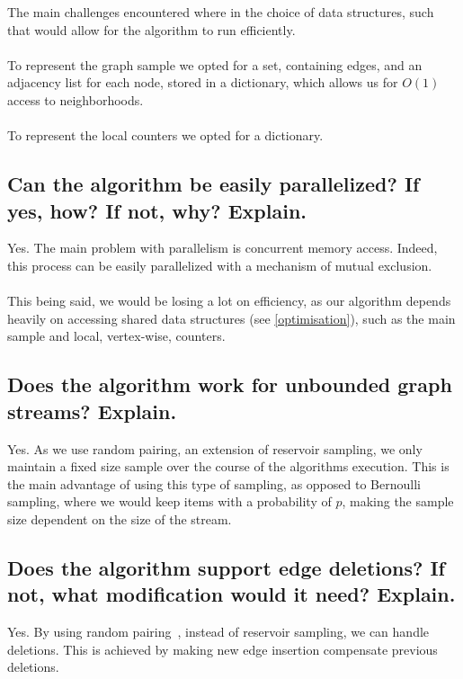 \documentclass[]{article}
\begin{document}
The main challenges encountered where in the choice of data structures, such that would allow for the algorithm to run efficiently.\\
\\
To represent the graph sample we opted for a set, containing edges, and an adjacency list for each node, stored in a dictionary, which allows us for $O(1)$ access to neighborhoods.\\
\\
To represent the local counters we opted for a dictionary.

\subsection{Can the algorithm be easily parallelized? If yes, how? If not, why? Explain.}

Yes. The main problem with parallelism is concurrent memory access. Indeed, this process can be easily parallelized with a mechanism of mutual exclusion.\\
\\
This being said, we would be losing a lot on efficiency, as our algorithm depends heavily on accessing shared data structures (see \ref{optimisation}), such as the main sample and local, vertex-wise, counters.

\subsection{Does the algorithm work for unbounded graph streams? Explain.}

Yes. As we use random pairing, an extension of reservoir sampling, we only maintain a fixed size sample over the course of the algorithms execution. This is the main advantage of using this type of sampling, as opposed to Bernoulli sampling, where we would keep items with a probability of $p$, making the sample size dependent on the size of the stream.

\subsection{Does the algorithm support edge deletions? If not, what modification would it need? Explain.}

Yes. By using random pairing~\cite{randomsamp}, instead of reservoir sampling, we can handle deletions. This is achieved by making new edge insertion compensate previous deletions.

\printbibliography
\end{document}
